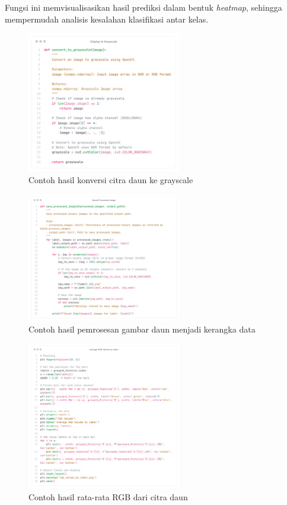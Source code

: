 Fungsi ini memvisualisasikan hasil prediksi dalam bentuk \textit{heatmap}, sehingga mempermudah analisis kesalahan klasifikasi antar kelas.

\begin{figure}[H]
  \centering
  \includegraphics[width=0.6\textwidth]{figure/chapter-4-convert_to_grayscale.png}
  \caption{Contoh hasil konversi citra daun ke grayscale}
  \label{fig:extract_rgb}
\end{figure}

\begin{figure}[H]
  \centering
  \includegraphics[width=0.6\textwidth]{figure/chapter-4-save_processed_images2.png}
  \caption{Contoh hasil pemrosesan gambar daun menjadi kerangka data}
  \label{fig:extract_rgb}
\end{figure}

\begin{figure}[H]
  \centering
  \includegraphics[width=0.6\textwidth]{figure/chapter-4-average_rgb.png}
  \caption{Contoh hasil rata-rata RGB dari citra daun}
  \label{fig:extract_rgb}
\end{figure}

